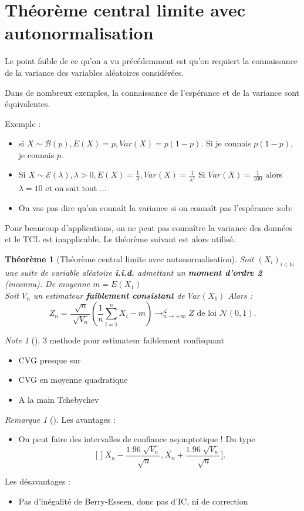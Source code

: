 \documentclass{article}
\theoremstyle{plain}%
\newtheorem{thm}{Théorème}[section]
\theoremstyle{definition}
\theoremstyle{remark}
\newtheorem*{rem}{Remarque}
\newtheorem*{note}{Note}
\begin{document}
\section{Théorème central limite avec autonormalisation}
Le point faible de ce qu'on a vu précédemment est qu'on requiert la connaissance de la variance des variables aléatoires considérées.

Dans de nombreux exemples, la connaissance de l'espérance et de la variance sont équivalentes. 

Exemple : \begin{itemize}
    \item si $ X \sim \mathcal{B}(p), E(X) = p, Var(X) = p(1-p) $. Si je connais $ p(1-p) $, je connais $ p $. 
    \item Si $ X \sim \mathcal{E}(\lambda ), \lambda > 0, E(X) = \frac{1}{\lambda }, Var(X)= \frac{1}{\lambda ^2} $ Si $ Var(X) = \frac{1}{100} $ alors $ \lambda = 10 $ et on sait tout ...
    \item On vas pas dire qu'on connaît la variance si on connaît pas l'espérance :sob:
\end{itemize} 
Pour beaucoup d'applications, on ne peut pas connaître la variance des données et le TCL est inapplicable. Le théorème suivant est alors utilisé.

\begin{thm}[Théorème central limite avec autonormalisation]
    Soit $ (X_i)_{i \in \mathbb{N}} $ une suite de variable aléatoire \textbf{i.i.d.} admettant un \textbf{moment d'ordre 2} (inconnu). De moyenne $ m=E(X_1) $  \\
    Soit $ V_n $ un estimateur \textbf{faiblement consistant} de $ Var(X_1) $ Alors :
    \[
        Z_n = \frac{\sqrt[]{n}}{\sqrt[]{V_n}}(\frac{1}{n}\sum_{i=1}^{n}X_i - m) \to^\mathcal{L}_{n \to +\infty } Z \text{ de loi } \mathcal{N}(0,1)
    .\]
\end{thm}
\begin{note}[]
    3 methode pour estimateur faiblement confisquant
    \begin{itemize}
        \item CVG presque sur 
        \item CVG en moyenne quadratique 
        \item A la main Tchebychev
    \end{itemize} 
\end{note}


\begin{rem}[]
    Les avantages : \begin{itemize}
        \item On peut faire des intervalles de confiance asymptotique ! Du type 
        \[
            []\bar{X_n} - \frac{1.96 \sqrt[]{V_n}}{\sqrt[]{n}}, \bar{X_n} + \frac{1.96 \sqrt[]{V_n}}{\sqrt[]{n}} ]
        .\]
    \end{itemize}
    Les désavantages : \begin{itemize}
        \item Pas d'inégalité de Berry-Esseen, donc pas d'IC, ni de correction
    \end{itemize}
\end{rem}
\end{document}
